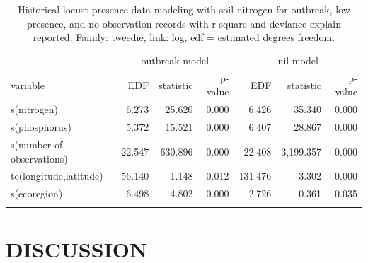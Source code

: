 \documentclass[
]{article}
\begin{document}
\begingroup
\fontsize{12.0pt}{14.4pt}\selectfont

\begin{longtable}{lrrrrrr}

\toprule
 & \multicolumn{3}{c}{outbreak model} & \multicolumn{3}{c}{nil model} \\ 
\cmidrule(lr){2-4} \cmidrule(lr){5-7}
variable & EDF & statistic & p-value & EDF & statistic & p-value \\ 
\midrule\addlinespace[2.5pt]
s(nitrogen) & 6.273 & 25.620 & 0.000 & 6.426 & 35.340 & 0.000 \\ 
s(phosphorus) & 5.372 & 15.521 & 0.000 & 6.407 & 28.867 & 0.000 \\ 
s(number of observations) & 22.547 & 630.896 & 0.000 & 22.408 & 3,199.357 & 0.000 \\ 
te(longitude,latitude) & 56.140 & 1.148 & 0.012 & 131.476 & 3.302 & 0.000 \\ 
s(ecoregion) & 6.498 & 4.802 & 0.000 & 2.726 & 0.361 & 0.035 \\ 
\bottomrule

\caption{\label{tbl-spatial-modeling-outbreak-model-results}Historical
locust presence data modeling with soil nitrogen for outbreak, low
presence, and no observation records with r-square and deviance explain
reported. Family: tweedie, link: log, edf = estimated degrees freedom.}

\tabularnewline

\end{longtable}

\endgroup

\section{DISCUSSION}\label{discussion}
\end{document}
